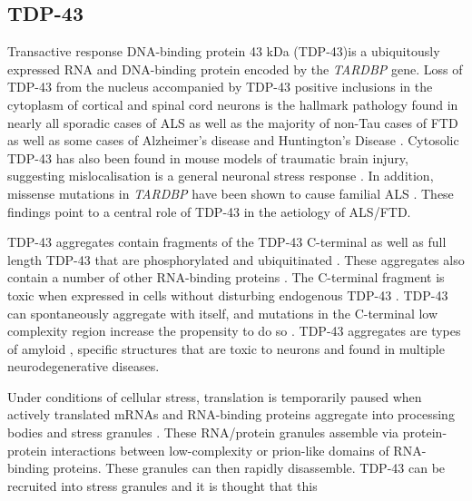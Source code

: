 \subsection{TDP-43}
Transactive response DNA-binding protein 43 kDa (TDP-43)is a ubiquitously expressed RNA and DNA-binding protein encoded by the \emph{TARDBP} gene. 
Loss of TDP-43 from the nucleus accompanied by TDP-43 positive inclusions in the cytoplasm of cortical and spinal cord neurons is the hallmark pathology found in nearly all sporadic cases of ALS as well as the majority of non-Tau cases of FTD \citep{Neumann2006-re,Arai2006} as well as some cases of Alzheimer's disease \citep{LaClair2016} and Huntington's Disease \citep{Doi2008}. 
Cytosolic TDP-43 has also been found in mouse models of traumatic brain injury, suggesting mislocalisation is a general neuronal stress response \citep{Moisse2009}. 
In addition, missense mutations in \emph{TARDBP} have been shown to cause familial ALS \citep{Sreedharan2008-xv}. 
These findings point to a central role of TDP-43 in the aetiology of ALS/FTD. 


TDP-43 aggregates contain fragments of the TDP-43 C-terminal as well as full length TDP-43 that are phosphorylated and ubiquitinated \citep{Neumann2006,Arai2006, Bosque2013, Hasegawa2008}.
These aggregates also contain a number of other RNA-binding proteins \citep{Dammer2012}.
The C-terminal fragment is toxic when expressed in cells without disturbing endogenous TDP-43 \citep{Zhang2009}.
TDP-43 can spontaneously aggregate with itself, and mutations in the C-terminal low complexity region increase the propensity to do so \citep{Johnson2009}.
TDP-43 aggregates are types of amyloid \citep{Fang2014}, specific structures that are toxic to neurons and found in multiple neurodegenerative diseases.

Under conditions of cellular stress, translation is temporarily paused when actively translated mRNAs and RNA-binding proteins aggregate into processing bodies and stress granules \citep{Anderson2008}. 
These RNA/protein granules assemble via protein-protein interactions between low-complexity or prion-like domains of RNA-binding proteins.
These granules can then rapidly disassemble.
TDP-43 can be recruited into stress granules \citep{Colombrita2009} and it is thought that this 


